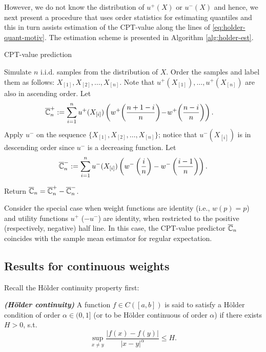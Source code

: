 However, we do not know the distribution of $u^+(X)$ or $u^-(X)$ and hence, we next present a procedure that uses order statistics for estimating quantiles and this in turn assists estimation of the CPT-value along the lines of \eqref{eq:holder-quant-motiv}. The estimation scheme is presented in Algorithm \ref{alg:holder-est}.

\begin{algorithm}
\caption{CPT-value prediction}
\label{alg:holder-est}
\begin{algorithmic}[1]
\State Simulate $n$ i.i.d. samples from the distribution of $X$.
\State Order the samples and label them as follows: 
$X_{[1]}, X_{[2]}, \ldots ,X_{[n]}$. Note that $u^+(X_{[1]}),\ldots ,u^+(X_{[n]})$ are also in ascending order.
\State Let
\vspace{-0.5ex}
$$\hspace{-1.1em}\overline \C_n^+:=\sum_{i=1}^{n} u^+(X_{[i]}) \left(w^+\!\left(\frac{n+1-i}{n}\right)\!-\! w^+\!\left(\frac{n-i}{n}\right) \right).$$
\vspace{-0.5ex}
\State Apply $u^{-}$ on the sequence $\{X_{[1]}, X_{[2]}, \ldots ,X_{[n]}\}$; notice that $u^{-}(X_{[i]})$ is in descending order since $u^{-}$ is a decreasing function.     
\State Let
\vspace{-0.5ex}
$$\overline {\mathbb{C}}_n^-:=\sum_{i=1}^{n} u^-(X_{[i]}) \left(w^-\left(\frac{i}{n}\right)- w^-\left(\frac{i-1}{n}\right) \right). $$

\vspace{-0.5ex}
\State Return $\overline {\mathbb{C}}_n =\overline {\mathbb{C}}_n^+ - \overline {\mathbb{C}}_n^-$.
\end{algorithmic}
\end{algorithm}
Consider the special case when weight functions are identity (i.e., $w(p)=p$) and utility functions $u^+$ ($-u^-$) are identity, when restricted to the positive (respectively, negative) half line. In this case, the CPT-value predictor $\overline {\mathbb{C}}_n$ coincides with the sample mean estimator for regular expectation. 

\subsection{Results for \holder continuous weights}
Recall the H\"{o}lder continuity property first:
\begin{definition}\label{holder}
{\textbf{\textit{(H\"{o}lder continuity)}}}
A function $f \in C([a,b])$ is said to satisfy
a H\"{o}lder condition of order $\alpha\in (0,1]$ (or to be H\"{o}lder continuous
of order $\alpha$) if there exists $ H>0$, s.t.
\[
\sup_{x \neq y} \frac{| f(x) - f(y) |}{| x-y |^{\alpha}} \leq H .
\]
\end{definition}

